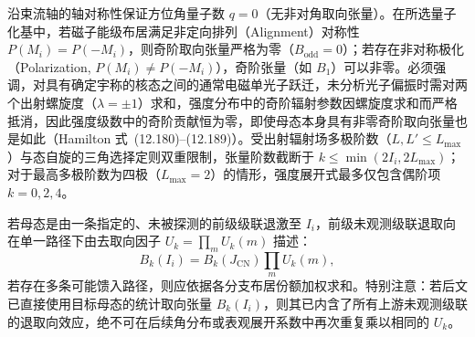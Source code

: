 沿束流轴的轴对称性保证方位角量子数 $q = 0$（无非对角取向张量）。在所选量子化基中，若磁子能级布居满足非定向排列（Alignment）对称性 $P(M_i) = P(-M_i)$，则奇阶取向张量严格为零（$B_{\mathrm{odd}} = 0$）；若存在非对称极化（Polarization, $P(M_i) \ne P(-M_i)$），奇阶张量（如 $B_1$）可以非零。必须强调，对具有确定宇称的核态之间的通常电磁单光子跃迁，未分析光子偏振时需对两个出射螺旋度（$\lambda = \pm 1$）求和，强度分布中的奇阶辐射参数因螺旋度求和而严格抵消，因此强度级数中的奇阶贡献恒为零，即使母态本身具有非零奇阶取向张量也是如此（Hamilton 式~(12.180)--(12.189)）。受出射辐射场多极阶数（$L, L' \le L_{\max}$）与态自旋的三角选择定则双重限制，张量阶数截断于 $k \le \min(2I_i, 2L_{\max})$；对于最高多极阶数为四极（$L_{\max}=2$）的情形，强度展开式最多仅包含偶阶项 $k = 0, 2, 4$。

若母态是由一条指定的、未被探测的前级级联退激至 $I_i$，前级未观测级联退取向在单一路径下由去取向因子 $U_k = \prod_m U_k(m)$ 描述：
\begin{equation}\label{eq:5-7-deorientation}
B_k(I_i) = B_k(J_{\mathrm{CN}}) \prod_m U_k(m),
\end{equation}
若存在多条可能馈入路径，则应依据各分支布居份额加权求和。特别注意：若后文已直接使用目标母态的统计取向张量 $B_k(I_i)$，则其已内含了所有上游未观测级联的退取向效应，绝不可在后续角分布或表观展开系数中再次重复乘以相同的 $U_k$。

